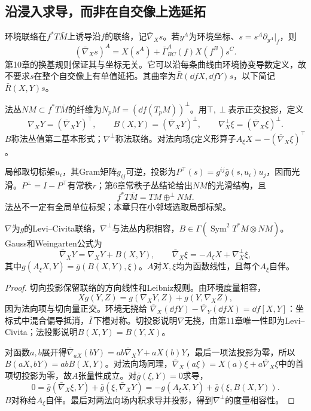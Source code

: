 \subsection*{沿浸入求导，而非在自交像上选延拓}
环境联络在$f^*T\bar M$上诱导沿$f$的联络，记$\bar\nabla_Xs$。若$y^A$为环境坐标、$s=s^A\partial_{y^A}|_f$，则
\[
 (\bar\nabla_Xs)^A=X(s^A)+\bar\Gamma^A_{BC}(f)X(f^B)s^C.
\]
第10章的换基规则保证其与坐标无关。它可以沿每条曲线由环境协变导数定义，故不要求$s$在整个自交像上有单值延拓。其曲率为$\bar R(\dd fX,\dd fY)s$，以下简记$\bar R(X,Y)s$。

\begin{definition}[法丛与第二基本形式]\label{def:normal-second-form}
法丛$NM\subset f^*T\bar M$的纤维为$N_pM=(\dd f(T_pM))^\perp$。用$\top,\perp$表示正交投影，定义
\[
 \nabla_XY=(\bar\nabla_XY)^\top,\qquad
 B(X,Y)=(\bar\nabla_XY)^\perp,\qquad
 \nabla_X^\perp\xi=(\bar\nabla_X\xi)^\perp.
\]
$B$称法丛值第二基本形式；$\nabla^\perp$称法联络。对法向场$\xi$定义形算子$A_\xi X=-(\bar\nabla_X\xi)^\top$。
\end{definition}

局部取切标架$u_i$，其Gram矩阵$g_{ij}$可逆，投影为$P^\top(s)=g^{ij}\bar g(s,u_i)u_j$，因而光滑。$P^\perp=I-P^\top$有常秩$r$；第6章常秩子丛结论给出$NM$的光滑结构，且
\[
 f^*T\bar M=TM\mathbin{\oplus^\perp}NM.
\]
法丛不一定有全局单位标架；本章只在小邻域选取局部标架。

\begin{theorem}[正交分解与诱导联络]\label{thm:gauss-weingarten}
$\nabla$为$g$的Levi--Civita联络，$\nabla^\perp$与法丛内积相容，$B\in\Gamma(\operatorname{Sym}^2T^*M\otimes NM)$。Gauss和Weingarten公式为
\[
 \bar\nabla_XY=\nabla_XY+B(X,Y),\qquad
 \bar\nabla_X\xi=-A_\xi X+\nabla_X^\perp\xi,
\]
其中$g(A_\xi X,Y)=\bar g(B(X,Y),\xi)$。$A$对$X,\xi$均为函数线性，且每个$A_\xi$自伴。
\end{theorem}
\begin{proof}
切向投影保留联络的方向线性和Leibniz规则。由环境度量相容，
\[
 Xg(Y,Z)=g(\nabla_XY,Z)+g(Y,\nabla_XZ),
\]
因为法向项与切向量正交。环境无挠给
$\bar\nabla_X(\dd fY)-\bar\nabla_Y(\dd fX)=\dd f[X,Y]$：坐标式中混合偏导抵消，$\bar\Gamma$下槽对称。切投影说明$\nabla$无挠，由第11章唯一性即为Levi--Civita；法投影说明$B(X,Y)=B(Y,X)$。

对函数$a,b$展开得$\bar\nabla_{aX}(bY)=ab\bar\nabla_XY+aX(b)Y$，最后一项法投影为零，所以$B(aX,bY)=abB(X,Y)$。对法向场同理，$\bar\nabla_X(a\xi)=X(a)\xi+a\bar\nabla_X\xi$中的首项切投影为零，故$A$张量性成立。对$\bar g(\xi,Y)=0$求导，
\[
 0=\bar g(\bar\nabla_X\xi,Y)+\bar g(\xi,\bar\nabla_XY)
   =-g(A_\xi X,Y)+\bar g(\xi,B(X,Y)).
\]
$B$对称给$A_\xi$自伴。最后对两法向场内积求导并投影，得到$\nabla^\perp$的度量相容性。
\end{proof}


